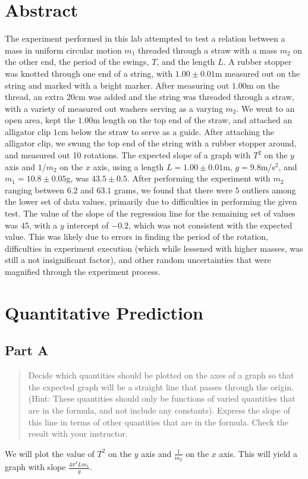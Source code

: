 \documentclass[8pt]{extarticle}
\title{}
\author{Avinash Iyer}
\date{}
\begin{document}
{
\section*{Abstract}%
\label{sec:Abstract}
The experiment performed in this lab attempted to test a relation between a mass in uniform circular motion $m_1$ threaded through a straw with a mass $m_2$ on the other end, the period of the swings, $T$, and the length $L$. A rubber stopper was knotted through one end of a string, with $1.00\pm 0.01$m measured out on the string and marked with a bright marker. After measuring out $1.00$m on the thread, an extra 20cm was added and the string was threaded through a straw, with a variety of measured out washers serving as a varying $m_2$. We went to an open area, kept the $1.00$m length on the top end of the straw, and attached an alligator clip $1$cm below the straw to serve as a guide. After attaching the alligator clip, we swung the top end of the string with a rubber stopper around, and measured out 10 rotations. The expected slope of a graph with $T^2$ on the $y$ axis and $1/m_{2}$ on the $x$ axis, using a length $L = 1.00 \pm 0.01$m, $g = 9.8$m/s$^2$, and $m_1 = 10.8\pm 0.05$g, was $43.5\pm 0.5$. After performing the experiment with $m_2$ ranging between $6.2$ and $63.1$ grams, we found that there were $5$ outliers among the lower set of data values, primarily due to difficulties in performing the given test. The value of the slope of the regression line for the remaining set of values was $45$, with a $y$ intercept of $-0.2$, which was not consistent with the expected value. This was likely due to errors in finding the period of the rotation, difficulties in experiment execution (which while lessened with higher masses, was still a not insignificant factor), and other random uncertainties that were magnified through the experiment process.
\section*{Quantitative Prediction}
\subsection*{Part A}
\begin{quote}
	Decide which quantities should be plotted on the axes of a graph so that the expected graph will be a straight line that passes through the origin. (Hint: These quantities should only be functions of varied quantities that are in the formula, and not include any constants). Express the slope of this line in terms of other quantities that are in the formula. Check the result with your instructor.
\end{quote}
We will plot the value of $T^{2}$ on the $y$ axis and $\frac{1}{m_2}$ on the $x$ axis. This will yield a graph with slope $\frac{4\pi^2Lm_1}{g}$.
}
\end{document}
